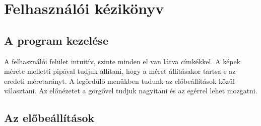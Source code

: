 \chapter{Felhasználói kézikönyv}

\section{A program kezelése}

A felhasználói felület intuitív, szinte minden el van látva címkékkel. 
A képek mérete melletti pipával tudjuk állítani, hogy a méret állításakor tartsa-e az eredeti méretarányt.
A legördülő menükben tudunk az előbeállítások közül választani. 
Az előnézetet a görgővel tudjuk nagyítani és az egérrel lehet mozgatni.

\section{Az előbeállítások}

